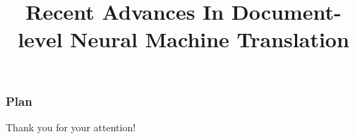 \documentclass[11.5pt, aspectratio=169]{beamer} %
\title[]{Recent Advances In Document-level Neural Machine Translation}
\author[L.\,Lupo]
{%
  \texorpdfstring{
    \begin{columns}%
      \column{1\linewidth}
      \centering
      Lorenzo Lupo\\
      \medskip
      Supervisors: Laurent Besacier, Marco Dinarelli\\
    \end{columns}
  }
  {Lorenzo Lupo}
}
\begin{document}
\begin{frame}[plain]
	\titlepage
\end{frame}





\begin{frame}
\frametitle{Plan} %
\tableofcontents %
\end{frame}






\begin{frame}[c]{}
  \begin{center}
	  \Huge Thank you for your attention!
  \end{center} 
\end{frame}


\appendix
\backupbegin

\begin{frame}[allowframebreaks]
\frametitle{\refname}

\end{frame}

%

\backupend
\end{document}
